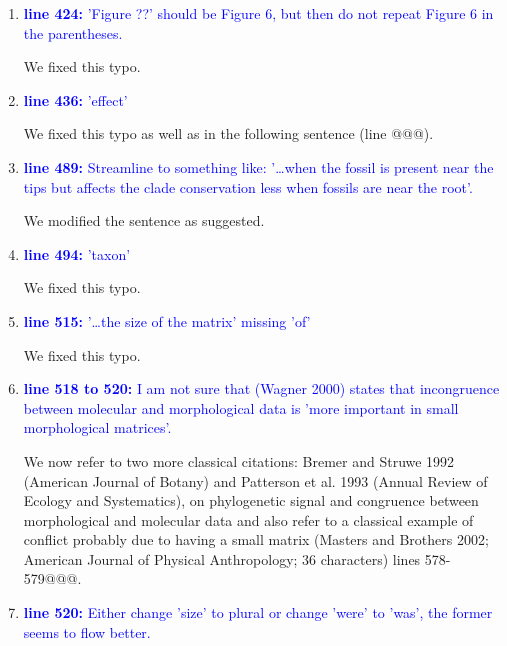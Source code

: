 \documentclass[12pt,letterpaper]{article}
\begin{document}
\begin{enumerate}
\item{\textcolor{blue}{\textbf{line 424:} 'Figure ??' should be Figure 6, but then do not repeat Figure 6 in the parentheses. }}

We fixed this typo.

\item{\textcolor{blue}{\textbf{line 436:} 'effect'}}

We fixed this typo as well as in the following sentence (line @@@).

\item{\textcolor{blue}{\textbf{line 489:} Streamline to something like: '…when the fossil is present near the tips but affects the clade conservation less when fossils are near the root'. }}

We modified the sentence as suggested.

\item{\textcolor{blue}{\textbf{line 494:} 'taxon'}}

We fixed this typo.

\item{\textcolor{blue}{\textbf{line 515:} '…the size of the matrix' missing 'of'}}

We fixed this typo.

\item{\textcolor{blue}{\textbf{line 518 to 520:} I am not sure that (Wagner 2000) states that incongruence between molecular and morphological data is 'more important in small morphological matrices'. }}

We now refer to two more classical citations: Bremer and Struwe 1992 (American Journal of Botany) and Patterson et al. 1993 (Annual Review of Ecology and Systematics), on phylogenetic signal and congruence between morphological and molecular data and also refer to a classical example of conflict probably due to having a small matrix (Masters and Brothers 2002; American Journal of Physical Anthropology; 36 characters) lines 578-579@@@.

\item{\textcolor{blue}{\textbf{line 520:} Either change 'size' to plural or change 'were' to 'was', the former seems to flow better. }}


\end{enumerate}
\end{document}
